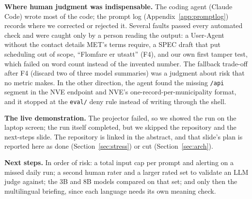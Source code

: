 \documentclass{article}
\newcommand{\code}[1]{\texttt{#1}}
\begin{document}
\textbf{Where human judgment was indispensable.} The coding agent (Claude Code) wrote most of the code; the prompt log (Appendix~\ref{app:promptlog}) records where we corrected or rejected it. Several faults passed every automated check and were caught only by a person reading the output: a User-Agent without the contact details MET's terms require, a SPEC draft that put scheduling out of scope, ``Flomfare er utsatt'' (F4), and our own first tamper test, which failed on word count instead of the invented number. The fallback trade-off after F4 (discard two of three model summaries) was a judgment about risk that no metric makes. In the other direction, the agent found the missing \code{/api} segment in the NVE endpoint and NVE's one-record-per-municipality format, and it stopped at the \code{eval/} deny rule instead of writing through the shell.

\textbf{The live demonstration.} The projector failed, so we showed the run on the laptop screen; the run itself completed, but we skipped the repository and the next-steps slide. The repository is linked in the abstract, and that slide's plan is reported here as done (Section~\ref{sec:stress}) or cut (Section~\ref{sec:arch}).

\textbf{Next steps.} In order of risk: a total input cap per prompt and alerting on a missed daily run; a second human rater and a larger rated set to validate an LLM judge against; the 3B and 8B models compared on that set; and only then the multilingual briefing, since each language needs its own meaning check.
\end{document}
